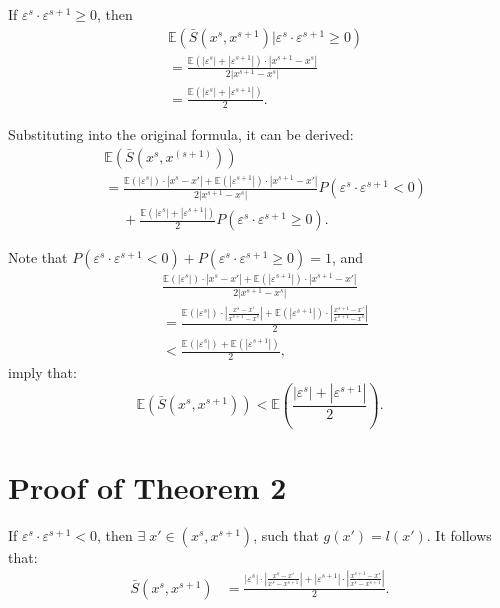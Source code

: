 \documentclass[lettersize,journal]{IEEEtran}
\begin{document}
{If $\varepsilon^s\cdot\varepsilon^{s+1}\ge0$, then
\begin{equation*}
\begin{aligned}
&\mathbb{E}(\bar{S}(x^s,x^{s+1})|\varepsilon^s\cdot
\varepsilon^{s+1}\ge0)\\
&=\frac{\mathbb{E}(|\varepsilon^s|+
|\varepsilon^{s+1}|)\cdot|x^{s+1}-x^{s}|}
{2|x^{s+1}-x^s|}\\
&=\frac{\mathbb{E}(|\varepsilon^s|+|\varepsilon^{s+1}|)}
{2}.
\end{aligned}
\end{equation*}

Substituting into the original formula, it can be derived:
\begin{equation*}
\begin{aligned}
&\mathbb{E}({\bar{S}(x^{s}, x^{(s+1)})})\\
&=\frac{{\mathbb{E}(|\varepsilon^s|)\cdot|x^s-x'|+
\mathbb{E}(|\varepsilon^{s+1}|)\cdot|x^{s+1}-x'|}}
{2|x^{s+1}-x^s|}P(\varepsilon^s\cdot\varepsilon^{s+1}<0)\\
&\;\quad+\frac{\mathbb{E}(|\varepsilon^s|+|\varepsilon^
{s+1}|)}{2}P(\varepsilon^s\cdot\varepsilon^{s+1}\ge0).
\end{aligned}
\end{equation*}

Note that $P(\varepsilon^s\cdot\varepsilon^{s+1}<0)+
P(\varepsilon^s\cdot\varepsilon^{s+1}\ge0)=1$, and
\begin{equation*}
\begin{aligned}
&\frac{{\mathbb{E}(|\varepsilon^s|)\cdot|x^s-x'|+
\mathbb{E}(|\varepsilon^{s+1}|)\cdot|x^{s+1}-x'|}}
{2|x^{s+1}-x^s|} \\
&=\frac{{\mathbb{E}(|\varepsilon^s|)\cdot|\frac{x^s-x'}
{x^{s+1}-x^s}|+\mathbb{E}(|\varepsilon^{s+1}|)\cdot|
\frac{x^{s+1}-x'}{x^{s+1}-x^s}|}}{2}\\
&<\frac{{\mathbb{E}(|\varepsilon^s|)+\mathbb{E}(|
\varepsilon^{s+1}|)}}{2},
\end{aligned}
\end{equation*}
imply that:
\begin{equation*}
\mathbb{E}(\bar{S}(x^s,x^{s+1}))<\mathbb{E}(\frac{|
\varepsilon^s|+|\varepsilon^{s+1}|}{2}).
\end{equation*}

\section*{Proof of Theorem 2}
If $\varepsilon^s\cdot\varepsilon^{s+1}<0$, then $\exists
\;x'\in(x^s,x^{s+1})$, such that $g(x')=l(x')$. It follows 
that:
\begin{equation*}
\begin{aligned}
\bar{S}(x^s,x^{s+1})
&=\frac{|\varepsilon^{s}|\cdot|\frac{x^s-x'}{x^{s}-x^
{s+1}}|+|\varepsilon^{s+1}|\cdot|\frac{x^{s+1}-x'}{x^{s}-
x^{s+1}}|}{2}.
\end{aligned}
\end{equation*}

}
\end{document}
